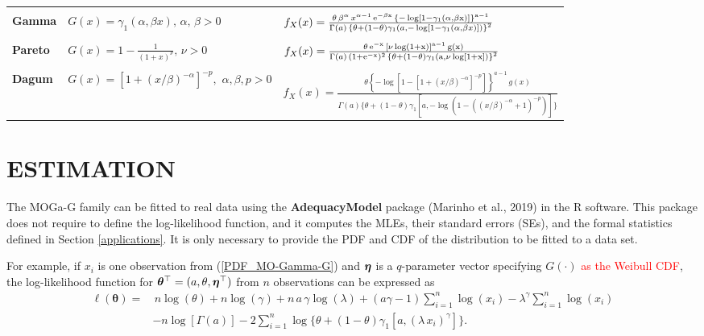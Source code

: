 \documentclass[twoside,leqno,11pt]{article}
\newcommand{\etn}{{\mbox{\boldmath $\eta$}}}
\begin{document}
\begin{table}[H]
{\begin{tabular}{l|l|l}
{} & {} & {} \\
\hline
{} & {} & {} \\
\textbf{Gamma} &  $G(x)=\gamma_1(\alpha,\beta x),\,\alpha,\,\beta>0$ & $f_{X}(x)=\frac{\theta\,\beta^{\alpha}\,x^{\alpha-1}\,\rm{e}^{-\beta x}\,\left\{ -\log[1-\gamma_1(\alpha,\beta x)] \right\}^{a-1}}{\Gamma(a)\,\left\{\theta+(1-\theta)\gamma_1\left( a, -\log \left[1-\gamma_1(\alpha,\beta x)\right]\right)\right\}^{2}}$ \\
{} & {} & {} \\                                                                                                                                                                          \hline
\textbf{Pareto} &  $G(x)=1-\frac{1}{(1+x)^\nu},\,\nu>0$ & $f_{X}(x)=\frac{\theta \, \rm{e}^{-x}\, \left[\nu\log(1+x)\right]^{a-1}\, g(x)}{\Gamma(a)\,(1+\rm{e}^{-x})^2\,\left\{\theta+(1-\theta)\gamma_1\left( a, \nu\log[1+x]\right)\right\}^{2}}$\\
{} & {} & {} \\
\hline
\textbf{Dagum} & $G(x) = [1 + (x/\beta) ^ {-\alpha}] ^ {-p},\,\, \alpha, \beta, p > 0$ & $f_X(x) = \frac{\theta  \left\{ -\log[1-[1 + (x/\beta) ^ {-\alpha}] ^ {-p}] \right\}^{a-1}\, g(x)}{\Gamma(a)\{\theta + (1 - \theta)\gamma_1[a, -\log   (1-((x/\beta)^{-\alpha}+1)^{-p})]\}}$ \\
\hline
\end{tabular}}
\end{table}

\section{ESTIMATION}\label{estimation}

The MOGa-G family can be fitted to real data using the {\bf AdequacyModel} package ({\color{red}Marinho et al., 2019}) 
in the {\sf R} software. This packa\-ge does not require to 
define the log-likelihood function, and it computes the MLEs, 
their standard errors (SEs), and the formal statistics defined 
in Section \ref{applications}. It is only necessary to provide the
PDF and CDF of the distribution to be fitted to a data set.

For example, if $x_i$ is one observation from (\ref{PDF_MO-Gamma-G}) and $\etn$ is a $q$-parameter vector specifying $G(\cdot)$ \textcolor{red}{as the Weibull CDF}, the log-likelihood function for $\boldsymbol{\theta}^\top=(a,\theta,\etn^\top)$ from $n$ observations can be expressed as 
\begin{align}\label{loglik}
\ell (\boldsymbol{\theta})=&\,n\log (\theta)+n\log(\gamma)+n\, a\, \gamma \log(\lambda)+(a\gamma-1)\sum_{i=1}^n{\log(x_i)}-\lambda^\gamma\sum_{i=1}^n{\log(x_i)}\nonumber \\ &
-n\log[\Gamma(a)]-2\sum_{i=1}^n{\log\{\theta+(1-\theta)\gamma_1[a,(\lambda\,x_i)^\gamma]\}}.
\end{align}
\end{document}
